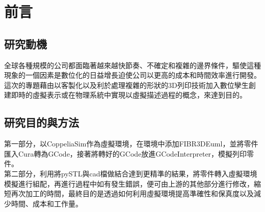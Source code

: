 \chapter{前言}
\renewcommand{\baselinestretch}{10.0} %
\setcounter{page}{1}  %
\fontsize{14pt}{2.5pt}\sectionef
\section{研究動機}
全球各種規模的公司都面臨著越來越快節奏、不確定和複雜的邊界條件，驅使這種現象的一個因素是數位化的日益增長迫使公司以更高的成本和時間效率進行開發。這次的專題藉由以客製化以及利於處理複雜的形狀的3D列印技術加入數位孿生創建即時的虛擬表示或在物理系統中實現以虛擬描述過程的概念，來達到目的。\\

\section{研究目的與方法}
第一部分，以CoppeliaSim作為虛擬環境，在環境中添加FIBR3DEuml，並將零件匯入Cura轉為GCode，接著將轉好的GCode放進GCodeInterpreter，模擬列印零件。\\

第二部分，利用將pySTL與cad檔做結合達到更精準的結果，將零件轉入虛擬環境模擬進行組配，再進行過程中如有發生錯誤，便可由上游的其他部分進行修改，縮短再次加工的時間，最終目的是透過如何利用虛擬環境提高準確性和保真度以及減少時間、成本和工作量。\\

\renewcommand{\baselinestretch}{0.5} %